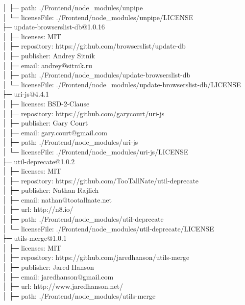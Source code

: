 \documentclass[
    paper=a4,
    twoside=false,
    parskip=half,
    listof=entryprefix,
    listof=totoc,
    index=totoc,
    bibliography=totoc,
    headsepline,
]{scrbook}
\begin{document}
    │  ├─ path: ./Frontend/node\_modules/unpipe\\
    │  └─ licenseFile: ./Frontend/node\_modules/unpipe/LICENSE\\
    ├─ update-browserslist-db@1.0.16\\
    │  ├─ licenses: MIT\\
    │  ├─ repository: https://github.com/browserslist/update-db\\
    │  ├─ publisher: Andrey Sitnik\\
    │  ├─ email: andrey@sitnik.ru\\
    │  ├─ path: ./Frontend/node\_modules/update-browserslist-db\\
    │  └─ licenseFile: ./Frontend/node\_modules/update-browserslist-db/LICENSE\\
    ├─ uri-js@4.4.1\\
    │  ├─ licenses: BSD-2-Clause\\
    │  ├─ repository: https://github.com/garycourt/uri-js\\
    │  ├─ publisher: Gary Court\\
    │  ├─ email: gary.court@gmail.com\\
    │  ├─ path: ./Frontend/node\_modules/uri-js\\
    │  └─ licenseFile: ./Frontend/node\_modules/uri-js/LICENSE\\
    ├─ util-deprecate@1.0.2\\
    │  ├─ licenses: MIT\\
    │  ├─ repository: https://github.com/TooTallNate/util-deprecate\\
    │  ├─ publisher: Nathan Rajlich\\
    │  ├─ email: nathan@tootallnate.net\\
    │  ├─ url: http://n8.io/\\
    │  ├─ path: ./Frontend/node\_modules/util-deprecate\\
    │  └─ licenseFile: ./Frontend/node\_modules/util-deprecate/LICENSE\\
    ├─ utils-merge@1.0.1\\
    │  ├─ licenses: MIT\\
    │  ├─ repository: https://github.com/jaredhanson/utils-merge\\
    │  ├─ publisher: Jared Hanson\\
    │  ├─ email: jaredhanson@gmail.com\\
    │  ├─ url: http://www.jaredhanson.net/\\
    │  ├─ path: ./Frontend/node\_modules/utils-merge\\
\end{document}
